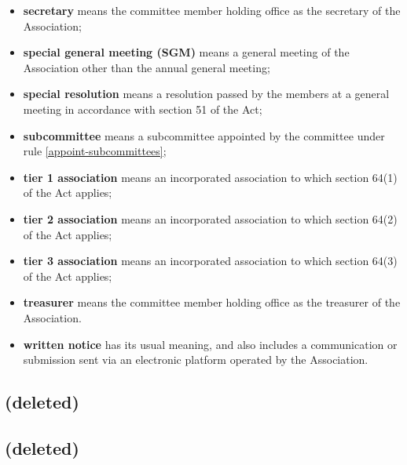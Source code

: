 \documentclass[../constitution.tex]{subfiles}
\begin{document}
\begin{itemize}[label={-}]
  \item \textbf{secretary} means the committee member holding office as the secretary of the Association;
  \item \textbf{special general meeting (SGM)} means a general meeting of the Association other than the annual general meeting;
  \item \textbf{special resolution} means a resolution passed by the members at a general meeting in accordance with section 51 of the Act;
  \item \textbf{subcommittee} means a subcommittee appointed by the committee under rule \ref{appoint-subcommittees};
  \item \textbf{tier 1 association} means an incorporated association to which section 64(1) of the Act applies;
  \item \textbf{tier 2 association} means an incorporated association to which section 64(2) of the Act applies;
  \item \textbf{tier 3 association} means an incorporated association to which section 64(3) of the Act applies;
  \item \textbf{treasurer} means the committee member holding office as the treasurer of the Association.
  \item \textbf{written notice} has its usual meaning, and also includes a communication or submission sent via an electronic platform operated by the Association.
\end{itemize}


\subsection{(deleted)}


\subsection{(deleted)}
\end{document}
